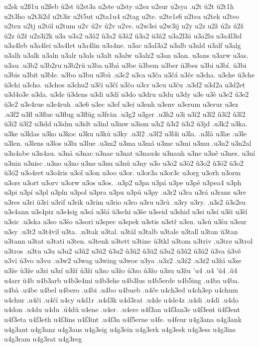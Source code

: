 {{u2sk
u2ß1u
u2ßeb
ů2st
ü2st3a
u2ste
u2sty
u2su
u2sur
u2sya
.u2t
ú2t
ü2t1h
u2t3ho
u2t3i2d
u2t3ir
u2t5ut
u2ta1u4
u2tag
u2te.
u2te1s6
u2tea
u2tek
u2teo
u2tex
u2tj
u2töl
u2tum
u2v
ú2v
ů2v
u2ve.
u2w3ei
u2w3ij
u2y
u2z
u2ž
ú2z
ú2ž
ů2z
ů2ž
u2z3i2k
u3a
u3a2
u3â2
û3a2
û3â2
ü3a2
ü3â2
u3a2l3ä
u3a2lu
u3a4l3id
u3a4leb
u3a4lei
u3a4let
u3a4lin
u3a4ne.
u3ac
u3al3a2
u3alb
u3ald
u3alf
u3alg
u3alh
u3alk
u3aln
u3alr
u3als
u3alt
u3alw
u3alz2
u3an
u3an.
u3ans
u3arw
u3as.
u3au
.u3b2
u3b2ru
u3b2rü
u3ba
u3bá
u3be
ü3bem
u3ber
ü3bes
u3bi
u3bí.
ü3bi
u3bis
u3bit
u3ble.
u3bo
u3bu
u3bů
.u3c2
u3ca
u3ča
u3čá
u3če
u3cha.
u3che
ü3che
ü3chi
u3cho.
u3chos
u3chu2
u3či
u3čí
u3čo
u3cr
u3cu
u3ču
.u3d2
u3d2a
u3d2et
u3d4o3e
u3da.
u3de
ü3dens
u3di
u3dí
u3do
u3dru
u3du
u3dy
u3e
u3è
u3e2
û3e2
ü3e2
u3e4rue
u3e4ruh
.u3e6
u3ec
u3ef
u3ei
u3enh
u3env
u3erum
u3erur
u3ez
.u3f2
u3fl
u3fluc
u3flug
u3flüg
u3frän
.u3g2
u3ger
.u3h2
u3i
u3i2
u3î2
û3i2
û3î2
ü3i2
ü3î2
u3idd
u3idm
u3idt
u3inl
u3inw
u3ism
u3ı2
û3ı2
ü3ı2
ů3jd
.u3k2
u3ka.
u3ke
u3klas
u3ko
u3koc
u3ku
u3ků
u3ky
.u3l2
.u3ł2
u3l4i
u3la.
.u3lå
u3læ
.u3le
u3len.
u3lens
u3los
u3lu
u3lue
.u3m2
u3ma
u3má
u3me
u3mi
u3mu
.u3n2
u3n2al
u3n4abe
u3n4au.
u3nå
u3nac
u3nae
u3nat
u3nau4s
u3nauh
u3ne
u3ně
u3nes.
u3ní
u3nin
u3nisc
.u3no
u3no
u3nø
u3nu
u3nů
u3ny
u3o
u3o2
u3ö2
û3o2
û3ö2
ü3o2
ü3ö2
u3o4ret
u3o4ris
u3ol
u3on
u3oo
u3or.
u3or3a
u3or3c
u3org
u3orh
u3orm
u3ors
u3ort
u3orv
u3orw
u3os
u3os.
.u3p2
u3pa
u3pá
u3pe
u3pě
u3pea4
u3ph
u3pi
u3pí
u3pl
u3pln
u3pol
u3pra
u3pu
u3pů
u3py
.u3r2
u3ra
u3rá
u3rans
u3re
u3res
u3ri
ü3ri
u3rif
u3rik
u3rim
u3rio
u3ro
u3ru
u3rů
.u3ry
u3ry.
.u3s2
ü3s2su
u3s4ann
u3s4piz
u3s4sig
u3sá
u3šá
ü3schi
u3še
u3seid
u3shid
u3si
u3sí
u3ši
u3ší
u3sic
.u3ska
u3so
u3šo
u3sori
u3spec
u3spek
u3stis
u3stř
u3su.
u3sů
u3šu
u3sur
u3sy
.u3t2
u3t4vil
u3ta.
.u3tak
u3tal.
u3tål
u3talb
u3tale
u3tall
u3tan
ü3tan
u3tann
u3tat
u3tati
u3ten.
u3tenk
u3tett
u3tine
ů3tkl
u3tom
u3triv
.u3trø
u3trol
u3tros
.u3tu
u3u
u3u2
u3û2
u3ü2
û3u2
û3û2
û3ü2
ü3u2
ü3û2
ü3ü2
ů3va
ů3vě
u3vi
ů3vo
u3vu
.u3w2
u3wag
u3wing
u3woe
u3ya
.u3z2
.u3ź2
.u3ż2
u3žá
u3ze
u3že
ů3že
u3zi
u3zí
u3ží
ů3ži
u3zo
u3žo
ů3zo
ů3žo
u3zu
u3žu
'u4
.u4
'û4
.û4
u4arr
ü4b
u4b3arb
u4b3e4mi
u4b3ehe
u4b3lus
u4b5erde
u4b5ing
.u4ba
u4ba.
u4bå
.u4be
u4bel
u4bero
.u4bi
.u4bo
u4bueb
.u4če
u4ch3ed
u4ch3ep
u4chum
u4chur
.u4či
.u4čí
u4cy
u4d1r
.u4d3k
u4d3rat
.u4de
u4de4z
.u4di
.u4dí
.u4do
u4don
.u4du
u4du
.ú4dů
u4ene
.u4er.
.u4ere
u4f3an
u4f3an3e
u4f3ent
ü4f3ent
u4f3eta
u4f3eth
u4f3ins
u4f3int
.u4f3n
u4f5erne
u4fe.
u4feur
u4g3ana
u4g3ank
u4g3ant
u4g3anz
u4g3aus
u4g3eig
u4g3ein
u4g3erk
u4g3esk
u4g3ess
u4g3ins
u4g3ram
u4g3rat
u4g3reg
}}
